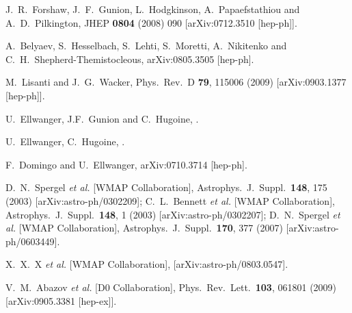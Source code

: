 \documentclass[aps,prl,twocolumn,nofootinbib,superscriptaddress]{revtex4}
\begin{document}
\begin{thebibliography}{99}
  J.~R.~Forshaw, J.~F.~Gunion, L.~Hodgkinson, A.~Papaefstathiou and A.~D.~Pilkington,
  JHEP {\bf 0804} (2008) 090
  [arXiv:0712.3510 [hep-ph]].  
  
  A.~Belyaev, S.~Hesselbach, S.~Lehti, S.~Moretti, 
  A.~Nikitenko and C.~H.~Shepherd-Themistocleous,
  arXiv:0805.3505 [hep-ph]. 
  

  M.~Lisanti and J.~G.~Wacker,
  Phys.\ Rev.\  D {\bf 79}, 115006 (2009)
  [arXiv:0903.1377 [hep-ph]].

 U.~Ellwanger, J.F.~Gunion and C.~Hugoine,
.

 U.~Ellwanger, C.~Hugoine, .

 F.~Domingo and U.~Ellwanger, arXiv:0710.3714 [hep-ph].

  D.~N.~Spergel {\it et al.}  [WMAP Collaboration],
  Astrophys.\ J.\ Suppl.\  {\bf 148}, 175 (2003)
  [arXiv:astro-ph/0302209];
%
  C.~L.~Bennett {\it et al.}  [WMAP Collaboration],
  Astrophys.\ J.\ Suppl.\  {\bf 148}, 1 (2003)
  [arXiv:astro-ph/0302207];
%
  D.~N.~Spergel {\it et al.}  [WMAP Collaboration],
  Astrophys.\ J.\ Suppl.\  {\bf 170}, 377 (2007)
  [arXiv:astro-ph/0603449].  

  X.~X.~X {\it et al.}  [WMAP Collaboration],
  [arXiv:astro-ph/0803.0547].  


  V.~M.~Abazov {\it et al.}  [D0 Collaboration],
  Phys.\ Rev.\ Lett.\  {\bf 103}, 061801 (2009)
  [arXiv:0905.3381 [hep-ex]].


\end{thebibliography}
\end{document}
